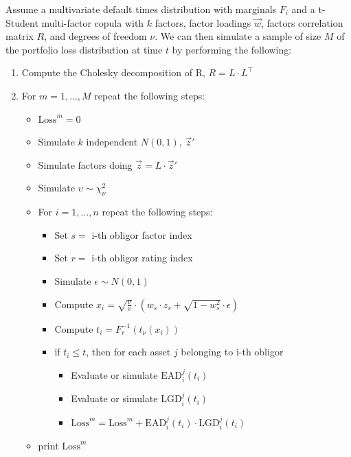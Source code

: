 \documentclass[11pt,fleqn]{book} %
\begin{document}
\begin{algorithm}
	\label{alg:pldmc}
	Assume a multivariate default times distribution with marginals $F_i$
	and a t-Student multi-factor copula with $k$ factors, factor loadings 
	$\vec{w}$, factors correlation matrix $R$, and degrees of freedom $\nu$.
	We can then simulate a sample of size $M$ of the portfolio loss distribution
	at time $t$ by performing the following:
	\begin{enumerate}
		\item Compute the Cholesky decomposition of R, $R = L \cdot L^\intercal$
		\item For $m=1,\dots,M$ repeat the following steps:
		\begin{itemize}
			\item $\text{Loss}^m = 0$
			\item Simulate $k$ independent $N(0,1)$, $\vec{z}'$
			\item Simulate factors doing $\vec{z} = L \cdot \vec{z}'$
			\item Simulate $\upsilon \sim \chi_{\nu}^2$
			\item For $i=1,\dots,n$ repeat the following steps:
			\begin{itemize}
				\item Set $s = $ i-th obligor factor index
				\item Set $r = $ i-th obligor rating index
				\item Simulate $\epsilon \sim N(0,1)$
				\item Compute $x_i = \sqrt{\frac{\nu}{\upsilon}} \cdot \left( w_s \cdot z_s + \sqrt{1-w_s^2} \cdot \epsilon \right)$
				\item Compute $t_i = F_r^{-1}\left(t_{\nu}(x_i)\right)$
				\item if $t_i \le t$, then for each asset $j$ belonging to i-th obligor
				\begin{itemize}
					\item Evaluate or simulate $\text{EAD}_i^j(t_i)$
					\item Evaluate or simulate $\text{LGD}_i^j(t_i)$
					\item $\text{Loss}^m = \text{Loss}^m + \text{EAD}_i^j(t_i) \cdot \text{LGD}_i^j(t_i)$
				\end{itemize}
			\end{itemize}
			\item print $\text{Loss}^m$
		\end{itemize}
	\end{enumerate}
\end{algorithm}
\end{document}
